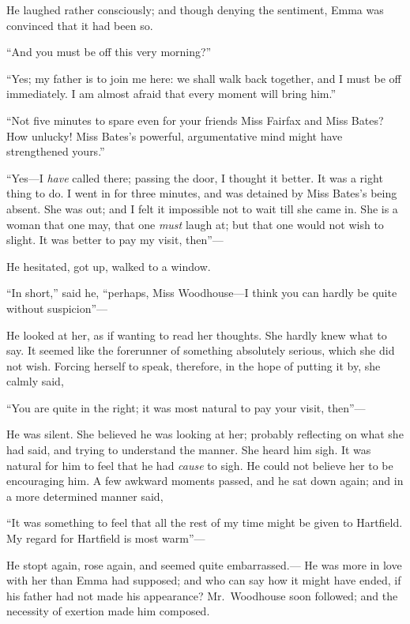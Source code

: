 He laughed rather consciously; and though denying the sentiment,
Emma was convinced that it had been so.

``And you must be off this very morning?''

``Yes; my father is to join me here:  we shall walk back together,
and I must be off immediately.  I am almost afraid that every moment
will bring him.''

``Not five minutes to spare even for your friends Miss Fairfax and
Miss Bates?  How unlucky!  Miss Bates's powerful, argumentative mind
might have strengthened yours.''

``Yes---I \emph{have} called there; passing the door, I thought it better.
It was a right thing to do.  I went in for three minutes, and was
detained by Miss Bates's being absent.  She was out; and I felt it
impossible not to wait till she came in.  She is a woman that one may,
that one \emph{must} laugh at; but that one would not wish to slight.
It was better to pay my visit, then''---%

He hesitated, got up, walked to a window.

``In short,'' said he, ``perhaps, Miss Woodhouse---I think you can
hardly be quite without suspicion''---%

He looked at her, as if wanting to read her thoughts.  She hardly
knew what to say.  It seemed like the forerunner of something
absolutely serious, which she did not wish.  Forcing herself
to speak, therefore, in the hope of putting it by, she calmly said,

``You are quite in the right; it was most natural to pay your visit, then''---%

He was silent.  She believed he was looking at her; probably reflecting
on what she had said, and trying to understand the manner.
She heard him sigh.  It was natural for him to feel that he had
\emph{cause} to sigh.  He could not believe her to be encouraging him.
A few awkward moments passed, and he sat down again; and in a more
determined manner said,

``It was something to feel that all the rest of my time might be
given to Hartfield.  My regard for Hartfield is most warm''---%

He stopt again, rose again, and seemed quite embarrassed.---%
He was more in love with her than Emma had supposed; and who can say
how it might have ended, if his father had not made his appearance?
Mr.\ Woodhouse soon followed; and the necessity of exertion made
him composed.

